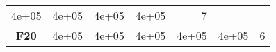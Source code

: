 \documentclass[12pt,a4paper]{article}
\begin{document}
\begin{longtable}[c]{@{}crrrrrr@{}}
\begin{minipage}[t]{0.08\columnwidth}
4e+05
\strut\end{minipage} &
\begin{minipage}[t]{0.09\columnwidth}\raggedleft\strut
4e+05
\strut\end{minipage} &
\begin{minipage}[t]{0.10\columnwidth}\raggedleft\strut
4e+05
\strut\end{minipage} &
\begin{minipage}[t]{0.11\columnwidth}\raggedleft\strut
4e+05
\strut\end{minipage} &
\begin{minipage}[t]{0.07\columnwidth}\raggedleft\strut
7
\strut\end{minipage}\tabularnewline
\begin{minipage}[t]{0.11\columnwidth}\centering\strut
\textbf{F20}
\strut\end{minipage} &
\begin{minipage}[t]{0.08\columnwidth}\raggedleft\strut
4e+05
\strut\end{minipage} &
\begin{minipage}[t]{0.08\columnwidth}\raggedleft\strut
4e+05
\strut\end{minipage} &
\begin{minipage}[t]{0.09\columnwidth}\raggedleft\strut
4e+05
\strut\end{minipage} &
\begin{minipage}[t]{0.10\columnwidth}\raggedleft\strut
4e+05
\strut\end{minipage} &
\begin{minipage}[t]{0.11\columnwidth}\raggedleft\strut
4e+05
\strut\end{minipage} &
\begin{minipage}[t]{0.07\columnwidth}\raggedleft\strut
6
\strut\end{minipage}\tabularnewline
\bottomrule
\end{longtable}
\end{document}
